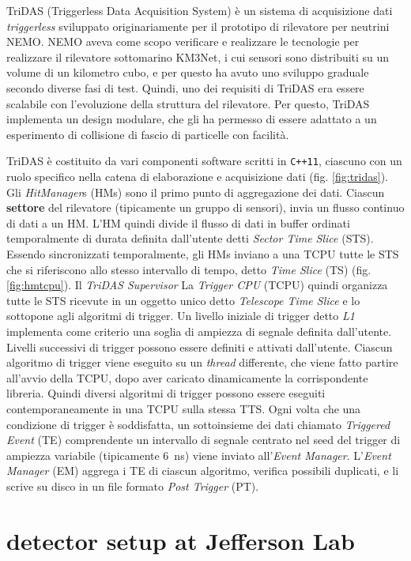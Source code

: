 \documentclass[../main.tex]{subfiles}
\begin{document}
TriDAS (Triggerless Data Acquisition System) è un sistema di acquisizione dati \emph{triggerless} sviluppato originariamente per il prototipo di rilevatore per neutrini \mbox{NEMO}. NEMO aveva come scopo verificare e realizzare le tecnologie per realizzare il rilevatore sottomarino KM3Net, i cui sensori sono distribuiti su un volume di un kilometro cubo, e per questo ha avuto uno sviluppo graduale secondo diverse fasi di test. Quindi, uno dei requisiti di TriDAS era essere scalabile con l'evoluzione della struttura del rilevatore. Per questo, TriDAS implementa un design modulare, che gli ha permesso di essere adattato a un esperimento di collisione di fascio di particelle con facilità.

TriDAS è costituito da vari componenti software scritti in \texttt{C++11}, ciascuno con un ruolo specifico nella catena di elaborazione e acquisizione dati (fig. \ref{fig:tridas}).
Gli \emph{HitManager}s (HMs) sono il primo punto di aggregazione dei dati. 
Ciascun \textbf{settore} del rilevatore (tipicamente un gruppo di sensori), invia un flusso continuo di dati a un HM. L'HM quindi divide il flusso di dati in buffer ordinati temporalmente di durata definita dall'utente detti \emph{Sector Time Slice} (STS). Essendo sincronizzati temporalmente, gli HMs inviano a una TCPU tutte le STS che si riferiscono allo stesso intervallo di tempo, detto \emph{Time Slice} (TS) (fig. \ref{fig:hmtcpu}).  
Il \emph{TriDAS Supervisor}
La \emph{Trigger CPU} (TCPU) quindi organizza tutte le STS ricevute in un oggetto unico detto \emph{Telescope Time Slice} e lo sottopone agli algoritmi di trigger. Un livello iniziale di trigger detto \emph{L1} implementa come criterio una soglia di ampiezza di segnale definita dall'utente. Livelli successivi  di trigger possono essere definiti e attivati dall'utente. Ciascun algoritmo di trigger viene eseguito su un \emph{thread} differente, che viene fatto partire all'avvio della TCPU, dopo aver caricato dinamicamente la corrispondente libreria.  Quindi diversi algoritmi di trigger possono essere eseguiti contemporaneamente in una TCPU sulla stessa TTS. Ogni volta che una condizione di trigger è soddisfatta, un sottoinsieme dei dati chiamato \emph{Triggered Event} (TE) comprendente un intervallo di segnale centrato nel seed del trigger di ampiezza variabile (tipicamente \SI{6}{\ns}) viene inviato all'\emph{Event Manager}. 
L'\emph{Event Manager} (EM) aggrega i TE di ciascun algoritmo, verifica possibili duplicati, e li scrive su disco in un file formato \emph{Post Trigger} (PT).




\section{detector setup at Jefferson Lab}
\end{document}
